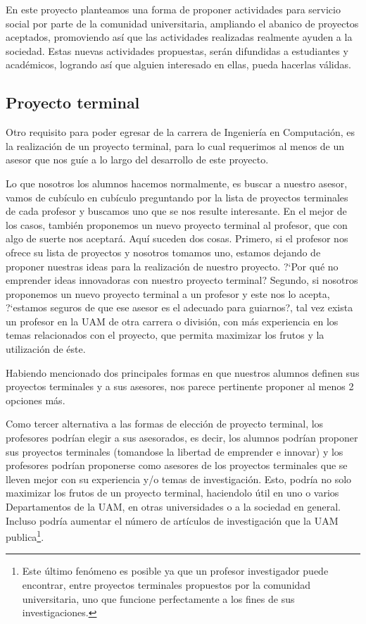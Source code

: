 \documentclass[12pt,letterpaper,titlepage]{article}
\begin{document}
En este proyecto planteamos una forma de proponer actividades para servicio social por parte de la comunidad universitaria, ampliando el abanico de proyectos aceptados, promoviendo as\'i que las actividades realizadas realmente ayuden a la sociedad. Estas nuevas actividades propuestas, ser\'an difundidas a estudiantes y acad\'emicos, logrando as\'i que alguien interesado en ellas, pueda hacerlas v\'alidas.


\subsection{Proyecto terminal}
Otro requisito para poder egresar de la carrera de Ingenier\'ia en Computaci\'on, es la realizaci\'on de un proyecto terminal, para lo cual requerimos al menos de un asesor que nos gu\'ie a lo largo del desarrollo de este proyecto.

Lo que nosotros los alumnos hacemos normalmente, es buscar a nuestro asesor, vamos de cub\'iculo en cub\'iculo preguntando por la lista de proyectos terminales de cada profesor y buscamos uno que se nos resulte interesante. En el mejor de los casos, tambi\'en proponemos un nuevo proyecto terminal al profesor, que con algo de suerte nos aceptar\'a. Aqu\'i suceden dos cosas. Primero, si el profesor nos ofrece su lista de proyectos y nosotros tomamos uno, estamos dejando de proponer nuestras ideas para la realizaci\'on de nuestro proyecto. ?`Por qu\'e no emprender ideas innovadoras con nuestro proyecto terminal? Segundo, si nosotros proponemos un nuevo proyecto terminal a un profesor y este nos lo acepta, ?`estamos seguros de que ese asesor es el adecuado para guiarnos?, tal vez exista un profesor en la UAM de otra carrera o divisi\'on, con m\'as experiencia en los temas relacionados con el proyecto, que permita maximizar los frutos y la utilizaci\'on de \'este.

Habiendo mencionado dos principales formas en que nuestros alumnos definen sus proyectos terminales y a sus asesores, nos parece pertinente proponer al menos 2 opciones m\'as.

Como tercer alternativa a las formas de elecci\'on de proyecto terminal, los profesores podr\'ian elegir a sus asesorados, es decir, los alumnos podr\'ian proponer sus proyectos terminales (tomandose la libertad de emprender e innovar) y los profesores podr\'ian proponerse como asesores de los proyectos terminales que se lleven mejor con su experiencia y/o temas de investigaci\'on. Esto, podr\'ia no solo maximizar los frutos de un proyecto terminal, haciendolo \'util en uno o varios Departamentos de la UAM, en otras universidades o a la sociedad en general. Incluso podr\'ia aumentar el n\'umero de art\'iculos de investigaci\'on que la UAM publica\footnote{Este \'ultimo fen\'omeno es posible ya que un profesor investigador puede encontrar, entre proyectos terminales propuestos por la comunidad universitaria, uno que funcione perfectamente a los fines de sus investigaciones.}.
\end{document}
